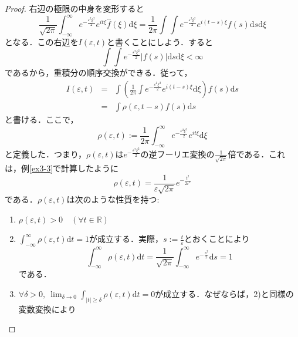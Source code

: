 \documentclass[a4j]{jsbook}
\numberwithin{theorem}{chapter}  %
\begin{document}
\begin{proof}
右辺の極限の中身を変形すると
\begin{equation*}
    \frac{1}{\sqrt{2\pi}}\int_{-\infty}^\infty e^{-\frac{\varepsilon^2\xi^2}{2}}e^{it\xi}\hat{f}(\xi)\mathrm{d}\xi=\frac{1}{2\pi}\int\int e^{-\frac{\varepsilon^2\xi^2}{2}}e^{i(t-s)\xi}f(s)\mathrm{d}s\mathrm{d}\xi
\end{equation*}
となる．この右辺を\(I(\varepsilon, t)\)と書くことにしよう．すると
\begin{equation*}
    \int\int e^{-\frac{\varepsilon^2\xi^2}{2}}|f(s)|\mathrm{d}s\mathrm{d}\xi<\infty
\end{equation*}
であるから，重積分の順序交換ができる．従って，
\begin{eqnarray}
I(\varepsilon, t)&=&\int\left(\frac{1}{2\pi}\int e^{-\frac{\varepsilon^2\xi^2}{2}}e^{i(t-s)\xi}\mathrm{d}\xi\right)f(s)\mathrm{d}s \nonumber \\
&=&\int\rho(\varepsilon, t-s)f(s)\mathrm{d}s \label{eq3-1}
\end{eqnarray}
と書ける．ここで，
\begin{equation*}
    \rho(\varepsilon, t):=\frac{1}{2\pi}\int_{-\infty}^\infty e^{-\frac{\varepsilon^2\xi^2}{2}}e^{it\xi}\mathrm{d}\xi
\end{equation*}
と定義した．つまり，\(\rho(\varepsilon, t)\)は\(\displaystyle e^{-\frac{\varepsilon^2\xi^2}{2}}\)の逆フーリエ変換の\(\displaystyle\frac{1}{\sqrt{2\pi}}\)倍である．これは，例\ref{ex3-3}で計算したように
\begin{equation*}
    \rho(\varepsilon, t)=\frac{1}{\varepsilon\sqrt{2\pi}}e^{-\frac{t^2}{2\varepsilon^2}}
\end{equation*}
である．\(\rho(\varepsilon, t)\)は次のような性質を持つ:
\begin{enumerate}
    \renewcommand{\labelenumi}{\arabic{enumi})}
    \item \(\rho(\varepsilon, t)>0\quad(\forall t\in\mathbb{R})\)
    \item \(\displaystyle\int_{-\infty}^\infty\rho(\varepsilon, t)\mathrm{d}t=1\)が成立する．実際，\(\displaystyle s:=\frac{t}{\varepsilon}\)とおくことにより
    \begin{equation*}
        \int_{-\infty}^\infty\rho(\varepsilon, t)\mathrm{d}t=\frac{1}{\sqrt{2\pi}}\int_{-\infty}^\infty e^{-\frac{s^2}{2}}\mathrm{d}s=1
    \end{equation*}
    である．
    \item \(\displaystyle\forall\delta>0,\ \lim_{\delta\to 0}\int_{|t|\geq\delta}\rho(\varepsilon, t)\mathrm{d}t=0\)が成立する．なぜならば，2)と同様の変数変換により

\end{enumerate}
\end{proof}
\end{document}
